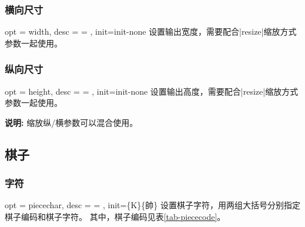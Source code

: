 \documentclass[full]{l3doc}
\begin{document}
\begin{documentation}
\bigskip

\subsubsection{横向尺寸}

\begin{option}{ opt = width, desc = {= }, init=init-none }
  设置输出宽度，需要配合|resize|缩放方式参数一起使用。
\end{option}

\begin{SideBySideExample}[frame=single,numbers=left,
                xrightmargin=.65\linewidth,gobble=2]
  \centering
  \cchessboard[resize=real,
                 width=7cm]
\end{SideBySideExample}

\bigskip

\subsubsection{纵向尺寸}

\begin{option}{ opt = height, desc = {= }, init=init-none }
  设置输出高度，需要配合|resize|缩放方式参数一起使用。
\end{option}

\begin{SideBySideExample}[frame=single,numbers=left,
                xrightmargin=.65\linewidth,gobble=2]
  \centering
  \cchessboard[resize=real,
               height=6cm]
\end{SideBySideExample}

  \textbf{\textsf{说明: }}缩放纵/横参数可以混合使用。

\bigskip

\subsection{棋子}

\subsubsection{字符}

\begin{option}{ opt = piecechar, desc = {= },
                init=\{K\}\{帥\} }
  设置棋子字符，用两组大括号分别指定棋子编码和棋子字符。
  其中，棋子编码见表\ref{tab-piececode}。
\end{option}


\end{documentation}
\end{document}
